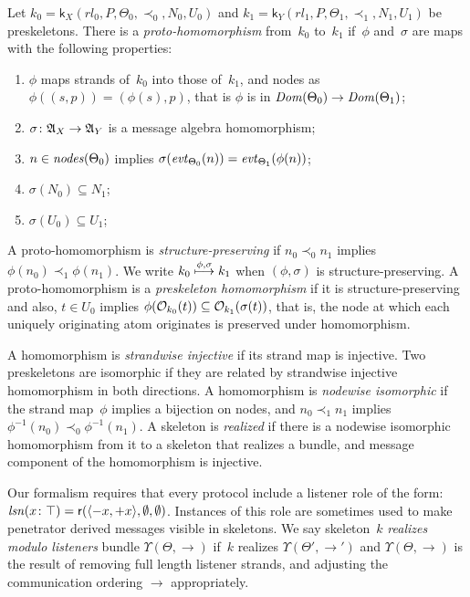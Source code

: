 \documentclass[12pt]{article}
\theoremstyle{definition}
\newcommand{\alga}{\alg{A}}
\newcommand{\sdom}{\fn{Dom}}
\newcommand{\evt}{\fn{evt}}
\newcommand{\role}{\mathsf{r}}
\newcommand{\skel}{\mathsf{k}}
\newcommand{\nodes}{\fn{nodes}}
\newcommand{\lsn}{\fn{lsn}}
\begin{document}
Let $k_0=\skel_X(rl_0,P,\Theta_0,\prec_0,N_0,U_0)$ and
$k_1=\skel_Y(rl_1,P,\Theta_1,\prec_1,N_1,U_1)$ be preskeletons.  There
is a \emph{proto-homomorphism} from~$k_0$ to~$k_1$ if~$\phi$ and~$\sigma$ are
maps with the following properties:
\begin{enumerate}
\item $\phi$ maps strands of~$k_0$ into those of~$k_1$, and nodes as
  $\phi((s,p))=(\phi(s),p)$, that is $\phi$ is in
  $\sdom(\Theta_0)\to\sdom(\Theta_1)$;
\item $\sigma\colon\alga_X\to\alga_Y$ is a message algebra homomorphism;
\item $n\in\nodes(\Theta_0)$ implies $\sigma(\evt_{\Theta_0}(n))=\evt_{\Theta_1}(\phi(n))$;
\item $\sigma(N_0)\subseteq N_1$;
\item $\sigma(U_0)\subseteq U_1$;
\end{enumerate}

A proto-homomorphism is \emph{structure-preserving} if $n_0\prec_0
n_1$ implies $\phi(n_0)\prec_1\phi(n_1)$.  We write
$k_0\stackrel{\phi,\sigma}{\longmapsto}k_1$ when $(\phi,\sigma)$ is
structure-preserving.  A proto-homomorphism is a \emph{preskeleton
  homomorphism} if it is structure-preserving and also, $t\in U_0$
implies $\phi(\mathcal{O}_{k_0}(t))\subseteq\mathcal{O}_{k_1}(\sigma(t))$, that
is, the node at which each uniquely originating atom originates is
preserved under homomorphism.

A homomorphism is \emph{strandwise injective} if its strand map is
injective.  Two preskeletons are isomorphic if they are related by
strandwise injective homomorphism in both directions.  A homomorphism
is \emph{nodewise isomorphic} if the strand map~$\phi$ implies a
bijection on nodes, and $n_0\prec_1 n_1$ implies
$\phi^{-1}(n_0)\prec_0\phi^{-1}(n_1)$.  A skeleton is \emph{realized}
if there is a nodewise isomorphic homomorphism from it to a skeleton
that realizes a bundle, and message component of the homomorphism
is injective.

Our formalism requires that every protocol include a listener role of
the form: $\lsn(x\colon\top)=\role(\seq{\inbnd x,\outbnd
  x},\emptyset,\emptyset)$.  Instances of this role are sometimes used
to make penetrator derived messages visible in skeletons.  We say
skeleton~$k$ \emph{realizes modulo listeners} bundle
$\Upsilon(\Theta,\to) $ if~$k$ realizes $\Upsilon(\Theta',\to')$ and
\hbox{$\Upsilon(\Theta,\to)$} is the result of removing full length listener
strands, and adjusting the communication ordering $\to$ appropriately.
\end{document}
